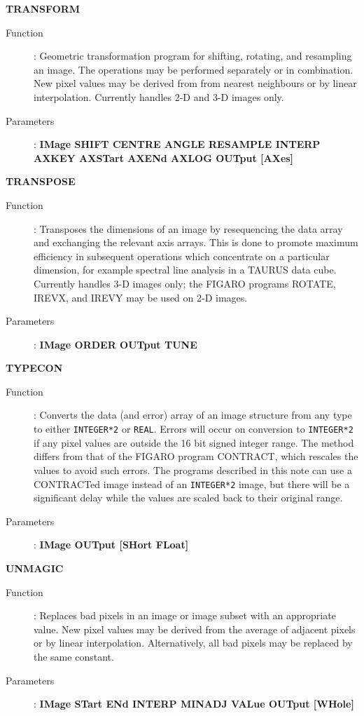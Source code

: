 {\large\bf TRANSFORM \hfill}
\begin{description}
\item[Function]: 
Geometric transformation program for shifting, rotating, and resampling an 
image. The operations may be performed separately or in combination. New pixel 
values may be derived from from nearest neighbours or by linear interpolation. 
Currently handles 2-D and 3-D images only. 
\item[Parameters]: 
{\bf IMage SHIFT CENTRE ANGLE RESAMPLE INTERP AXKEY AXSTart AXENd AXLOG OUTput
[AXes]}
\end{description}
\vspace{5mm}

{\large\bf TRANSPOSE \hfill}
\begin{description}
\item[Function]: 
Transposes the dimensions of an image by resequencing the data array and 
exchanging the relevant axis arrays. This is done to promote maximum efficiency
in subsequent operations which concentrate on a particular dimension, for 
example spectral line analysis in a TAURUS data cube. Currently handles 3-D 
images only; the FIGARO programs ROTATE, IREVX, and IREVY may be 
used on 2-D images.
\item[Parameters]: 
{\bf IMage ORDER OUTput TUNE}
\end{description}
\vspace{5mm}

{\large\bf TYPECON \hfill}
\begin{description}
\item[Function]: 
Converts the data (and error) array of an image structure from any type to 
either {\tt INTEGER*2} or {\tt REAL}. Errors will occur on conversion to 
{\tt INTEGER*2} if any pixel values are outside the 16 bit signed integer 
range. The method differs from that of the FIGARO program CONTRACT, which 
rescales the values to avoid such errors. The programs described in this 
note can use a CONTRACTed image instead of an {\tt INTEGER*2} image, but 
there will be a significant delay while the values are scaled back to their 
original range. 
\item[Parameters]: 
{\bf IMage OUTput [SHort FLoat]}
\end{description}
\vspace{5mm}

{\large\bf UNMAGIC \hfill}
\begin{description}
\item[Function]: 
Replaces bad pixels in an image or image subset with an appropriate value. New
pixel values may be derived from the average of adjacent pixels or by linear
interpolation. Alternatively, all bad pixels may be replaced by the same 
constant. 
\item[Parameters]: 
{\bf IMage STart ENd INTERP MINADJ VALue OUTput [WHole]}
\end{description}
\vspace{5mm}

